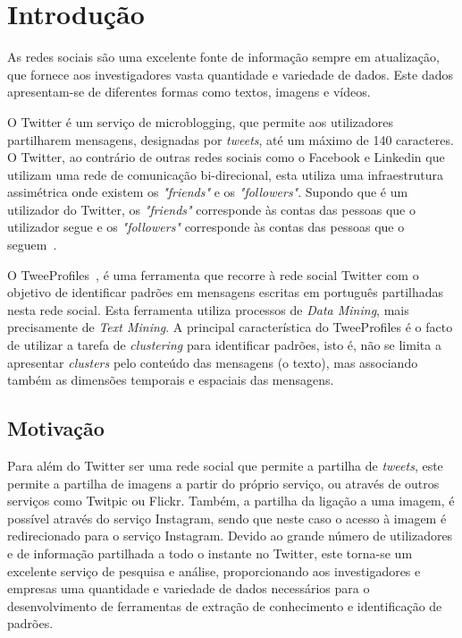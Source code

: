 \chapter{Introdução} \label{chap:intro}


As redes sociais são uma excelente fonte de informação sempre em atualização, que fornece aos investigadores vasta quantidade e variedade de dados. Este dados apresentam-se de diferentes formas como textos, imagens e vídeos. 


O Twitter é um serviço de microblogging, que permite aos utilizadores partilharem mensagens, designadas por \textit{tweets}, até um máximo de 140 caracteres. O Twitter, ao contrário de outras redes sociais como o Facebook e Linkedin que utilizam uma rede de comunicação bi-direcional, esta utiliza uma infraestrutura assimétrica onde existem os \textit{"friends"} e os \textit{"followers"}. Supondo que é um utilizador do Twitter, os \textit{"friends"} corresponde às contas das pessoas que o utilizador segue e os \textit{"followers"} corresponde às contas das pessoas que o seguem~\citet{Russell2011}.

O TweeProfiles~\citet{Cunha2013}, é uma ferramenta que recorre à rede social Twitter com o objetivo de identificar padrões em mensagens escritas em português partilhadas nesta rede social. Esta ferramenta utiliza processos de \textit{Data Mining}, mais precisamente de \textit{Text Mining}. A principal característica do TweeProfiles é o facto de utilizar a tarefa de \textit{clustering} para identificar padrões, isto é, não se limita a apresentar \textit{clusters} pelo conteúdo das mensagens (o texto), mas associando também as dimensões temporais e espaciais das mensagens. 

\section{Motivação} \label{sec:motiv}

Para além do Twitter ser uma rede social que permite a partilha de \textit{tweets}, este permite a partilha de imagens a partir do próprio serviço, ou através de outros serviços como Twitpic ou Flickr. Também, a partilha da ligação a uma imagem, é possível através do serviço Instagram, sendo que neste caso o acesso à imagem é redirecionado para o serviço Instagram. Devido ao grande número de utilizadores e de informação partilhada a todo o instante no Twitter, este torna-se um excelente serviço de pesquisa e análise, proporcionando aos investigadores e empresas uma quantidade e variedade de dados necessários para o desenvolvimento de ferramentas de extração de conhecimento e identificação de padrões. 

